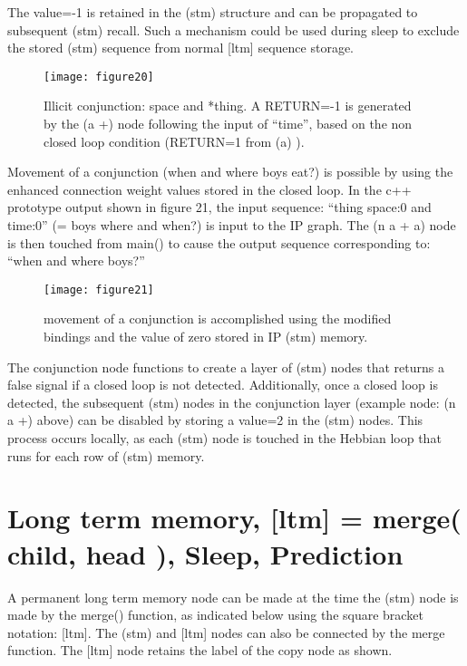 \documentclass{clv3}
\begin{document}
The value=-1 is retained in the (stm) structure and can be propagated to subsequent (stm) recall.  Such a mechanism could be used during sleep to exclude the stored (stm) sequence from normal [ltm] sequence storage.  


\begin{figure}[H]
\texttt{[image: figure20]}
\caption{Illicit conjunction: space and *thing.  A RETURN=-1 is generated by the (a +) node following the input of ``time'', based on the non closed loop condition (RETURN=1 from (a) ).}
\end{figure}






Movement of a conjunction (when and where boys eat?) is possible  by using the enhanced connection weight values stored in the closed loop.    In the c++ prototype output shown in figure 21, the input sequence: ``thing space:0 and time:0'' (= boys where and when?) is input to the IP graph.   The (n a + a) node is then touched from main() to cause the output sequence corresponding to: ``when and where boys?''


\begin{figure}[H]
\texttt{[image: figure21]}
\caption{movement of a conjunction is accomplished using the modified bindings and the value of zero stored in IP (stm) memory.}
\end{figure}

The conjunction node functions to create a layer of (stm) nodes that returns a false signal if a closed loop is not detected.  Additionally, once a closed loop is detected, the subsequent (stm) nodes in the conjunction layer (example node: (n a +) above)  can be disabled by storing a value=2 in the (stm) nodes.   This process occurs locally, as each (stm) node is touched in the Hebbian loop that runs for each row of (stm) memory. 








\section{Long  term memory, [ltm] = merge( child, head ), Sleep, Prediction }

A permanent long term memory  node can be made at the time the (stm) node is made by the merge() function, as indicated below using the square bracket notation: [ltm].   The (stm) and [ltm] nodes can also be connected by the merge function.   The [ltm] node retains the label of the copy node as shown.  
\end{document}
